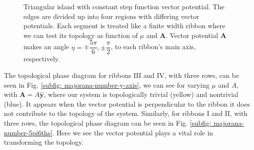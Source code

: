 \documentclass[aps,prb,showpacs,amsmath,amssymb,superscriptaddress]{revtex4-2}
\let\oldhat\hat
\renewcommand{\hat}[1]{\oldhat{\mathbf{#1}}}
\renewcommand{\vec}[1]{\mathbf{#1}}
\begin{document}
\begin{figure}[]
  \caption{Triangular island with constant step function vector potential. The edges are divided up into four regions with differing vector potentials. Each segment is treated like a finite width ribbon where we can test its topology as function of $\mu$ and $\vec{A}$. Vector potential $\vec{A}$ makes an angle $\eta =  \mp \dfrac{5\pi}{6}, \pm \dfrac{\pi}{2}$, to each ribbon's main axis, respectively.}
  \label{fig: triangular-island-vector-potential-divided}
\end{figure}

The topological phase diagram for ribbons III and IV, with three rows, can be seen in Fig. \ref{subfig: majorana-number-y-axis}, we can see for varying $\mu$ and $A$, with $\vec{A} = A\hat{y}$, where our system is topologically trivial (yellow) and nontrivial (blue).
It appears when the vector potential is perpendicular to the ribbon it does not contribute to the topology of the system.
Similarly, for ribbons I and II, with three rows, the topological phase diagram can be seen in Fig. \ref{subfig: majorana-number-5pi6ths}.
Here we see the vector potential plays a vital role in transforming the topology.
\end{document}
